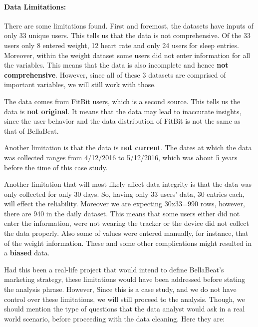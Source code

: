 \documentclass[
]{article}
\begin{document}
\hypertarget{data-limitations}{%
\paragraph{Data Limitations:}\label{data-limitations}}

There are some limitations found. First and foremost, the datasets have
inputs of only 33 unique users. This tells us that the data is not
comprehensive. Of the 33 users only 8 entered weight, 12 heart rate and
only 24 users for sleep entries. Moreover, within the weight dataset
some users did not enter information for all the variables. This means
that the data is also incomplete and hence \textbf{not comprehensive}.
However, since all of these 3 datasets are comprised of important
variables, we will still work with those.

The data comes from FitBit users, which is a second source. This tells
us the data is \textbf{not original}. It means that the data may lead to
inaccurate insights, since the user behavior and the data distribution
of FitBit is not the same as that of BellaBeat.

Another limitation is that the data is \textbf{not current}. The dates
at which the data was collected ranges from 4/12/2016 to 5/12/2016,
which was about 5 years before the time of this case study.

Another limitation that will most likely affect data integrity is that
the data was only collected for only 30 days. So, having only 33 users'
data, 30 entries each, will effect the reliability. Moreover we are
expecting 30x33=990 rows, however, there are 940 in the daily dataset.
This means that some users either did not enter the information, were
not wearing the tracker or the device did not collect the data properly.
Also some of values were entered manually, for instance, that of the
weight information. These and some other complications might resulted in
a \textbf{biased} data.

Had this been a real-life project that would intend to define
BellaBeat's marketing strategy, these limitations would have been
addressed before stating the analysis phrase. However, Since this is a
case study, and we do not have control over these limitations, we will
still proceed to the analysis. Though, we should mention the type of
questions that the data analyst would ask in a real world scenario,
before proceeding with the data cleaning. Here they are:
\end{document}
